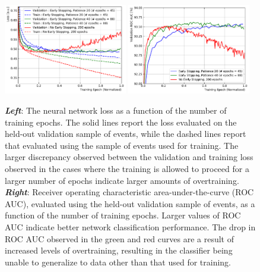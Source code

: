 \begin{figure}[!htb]
    \begin{center}
        \includegraphics[width=0.48\textwidth]{figures/search_hh/mva/overtrain_check_loss}
        \includegraphics[width=0.48\textwidth]{figures/search_hh/mva/overtrain_check_roc_auc}
        \caption{
            \textit{\textbf{Left}}: The neural network loss as a function of the number of training epochs.
                The solid lines report the loss evaluated on the held-out validation sample of events,
                while the dashed lines report that evaluated using the sample of events used for training.
                The larger discrepancy observed between the validation and training loss observed in the
                cases where the training is allowed to proceed for a larger number of epochs indicate
                larger amounts of overtraining.
            \textit{\textbf{Right}}: Receiver operating characteristic area-under-the-curve (ROC AUC), evaluated using
                the held-out validation sample of events, as a function of the number of training epochs.
                Larger values of ROC AUC indicate better network classification performance.
                The drop in ROC AUC observed in the green and red curves are a result of increased levels
                of overtraining, resulting in the classifier being unable to generalize to data other than
                that used for training.
        }
        \label{fig:nn_epoch_overtrain}
    \end{center}
\end{figure}

